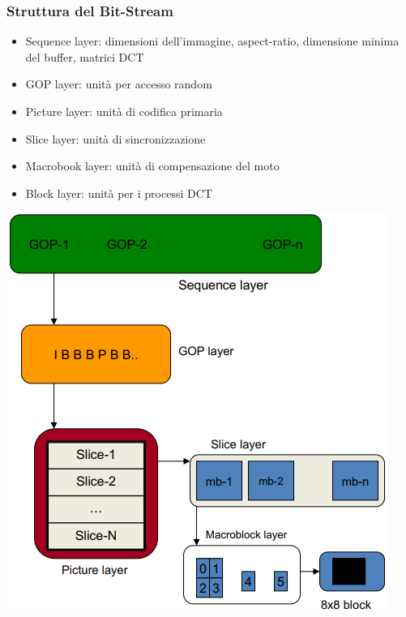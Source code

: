 \documentclass[a4paper,11pt]{article} %
\begin{document}
\subsubsection{Struttura del Bit-Stream}
\begin{minipage}{0.6\textwidth}
\begin{itemize}
\item Sequence layer: dimensioni dell'immagine, aspect-ratio, dimensione minima del buffer, matrici DCT
\item GOP layer: unità per accesso random
\item Picture layer: unità di codifica primaria
\item Slice layer: unità di sincronizzazione
\item Macrobook layer: unità di compensazione del moto
\item Block layer: unità per i processi DCT
\end{itemize}
\end{minipage}
\hspace{0.1\textwidth}
\begin{minipage}{0.3\textwidth}
\centering
    \includegraphics[width=\linewidth]{Bitstream structure.png}
\end{minipage}
\end{document}
